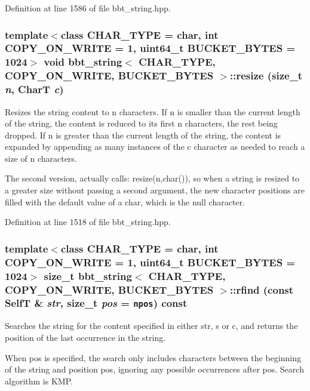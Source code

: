 Definition at line 1586 of file bbt\_\-string.hpp.\hypertarget{classbbt__string_9a3f14ffd3caa23664570a059f5f7626}{
\subsubsection[{resize}]{\setlength{\rightskip}{0pt plus 5cm}template$<$class CHAR\_\-TYPE  = char, int COPY\_\-ON\_\-WRITE = 1, uint64\_\-t BUCKET\_\-BYTES = 1024$>$ void {\bf bbt\_\-string}$<$ CHAR\_\-TYPE, COPY\_\-ON\_\-WRITE, BUCKET\_\-BYTES $>$::resize (size\_\-t {\em n}, \/  CharT {\em c})}}
\label{classbbt__string_9a3f14ffd3caa23664570a059f5f7626}


Resizes the string content to n characters. If n is smaller than the current length of the string, the content is reduced to its first n characters, the rest being dropped. If n is greater than the current length of the string, the content is expanded by appending as many instances of the c character as needed to reach a size of n characters.

The second version, actually calls: resize(n,char()), so when a string is resized to a greater size without passing a second argument, the new character positions are filled with the default value of a char, which is the null character. 

Definition at line 1518 of file bbt\_\-string.hpp.\hypertarget{classbbt__string_e9266d980b861118c6996014dadaeafe}{
\subsubsection[{rfind}]{\setlength{\rightskip}{0pt plus 5cm}template$<$class CHAR\_\-TYPE  = char, int COPY\_\-ON\_\-WRITE = 1, uint64\_\-t BUCKET\_\-BYTES = 1024$>$ size\_\-t {\bf bbt\_\-string}$<$ CHAR\_\-TYPE, COPY\_\-ON\_\-WRITE, BUCKET\_\-BYTES $>$::rfind (const {\bf SelfT} \& {\em str}, \/  size\_\-t {\em pos} = {\tt npos}) const}}
\label{classbbt__string_e9266d980b861118c6996014dadaeafe}


Searches the string for the content specified in either str, s or c, and returns the position of the last occurrence in the string.

When pos is specified, the search only includes characters between the beginning of the string and position pos, ignoring any possible occurrences after pos. Search algorithm is KMP.

